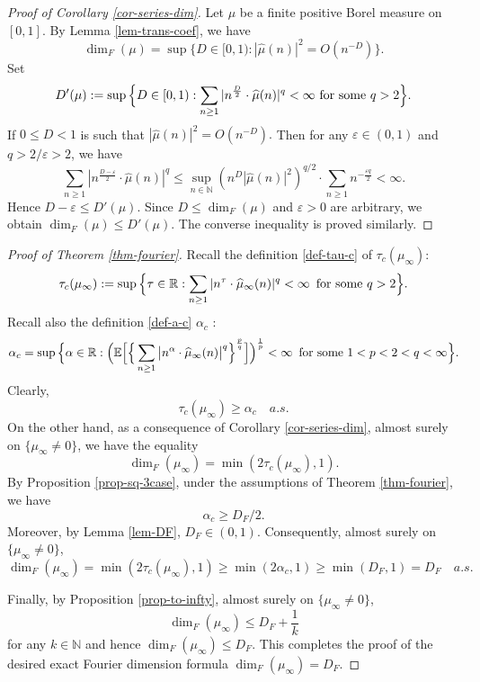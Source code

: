 \documentclass[12pt]{amsart}
\theoremstyle{definition}
\theoremstyle{remark}
\newcommand{\R}{\mathbb{R}}
\newcommand{\N}{\mathbb{N}}
\newcommand{\E}{\mathbb{E}}
\numberwithin{equation}{section}
\begin{document}
\begin{proof}[Proof of Corollary \ref{cor-series-dim}]
Let $\mu$ be a finite positive Borel  measure on $[0,1]$.  By Lemma \ref{lem-trans-coef}, we have 
\[
\dim_F(\mu) =  \sup \{ D \in [0,1):     |\widehat{\mu}(n)|^2  = O(n^{-D})   \}.
\]
Set
 \[
D'(\mu) := \sup \Big\{D \in [0,1):    \text{$  \sum_{n\ge 1 } | n^{\frac{D}{2}}  \cdot \widehat{\mu}(n)|^q <\infty$ for some $q>2$}    \Big\}. 
\]
If $0\le D<1$ is such that  
$
 |\widehat{\mu}(n)|^2  = O(n^{-D}). $ Then for any $\varepsilon\in (0,1)$ and $q>2/\varepsilon>2$, we have  
 \[
  \sum_{n\ge 1 } | n^{\frac{D-\varepsilon}{2}}  \cdot \widehat{\mu}(n)|^q    \le \sup_{n\in \N} (n^D |\widehat{\mu}(n)|^2)^{q/2}    \cdot \sum_{n\ge 1} n^{- \frac{\varepsilon q}{2}}<\infty. 
   \]
Hence  $D-\varepsilon\le D'(\mu)$. Since $D\le \dim_F(\mu)$ and $\varepsilon>0$ are arbitrary, we obtain $\dim_F(\mu)\le D'(\mu)$.  The converse inequality is proved similarly. 
\end{proof}





\begin{proof}[Proof of Theorem \ref{thm-fourier}]
Recall the definition \eqref{def-tau-c} of $\tau_c(\mu_\infty)$:
\[
\tau_c(\mu_\infty): =  \sup \Big\{\tau \in \R: \sum_{n\ge 1} | n^{\tau}  \cdot \widehat{\mu}_\infty(n)|^q<\infty \text{\, for some $q>2$} \Big\}. 
\]
Recall also the definition   \eqref{def-a-c}  $\alpha_c$ :
\[
\alpha_c =  \sup \Big\{\alpha \in \R:    \Big(\E\Big[  \Big\{ \sum_{n \ge 1}    \big| n^{\alpha} \cdot \widehat{\mu}_\infty(n)\big|^q  \Big\}^{\frac{p}{q}}\Big] \Big)^{\frac{1}{p}}  <\infty \text{\, for some $1<p<2<q<\infty$} \Big\}.
\]
Clearly, 
\[
\tau_c(\mu_\infty) \ge \alpha_c \quad a.s. 
\]
On the other hand, as a consequence of Corollary \ref{cor-series-dim},   almost surely on $\{\mu_\infty \ne 0\}$, we have  the equality 
\[
\dim_F(\mu_\infty) = \min( 2 \tau_c(\mu_\infty), 1).
\]
By Proposition \ref{prop-sq-3case}, under the assumptions of Theorem \ref{thm-fourier}, we have 
\[
\alpha_c\ge D_F/2. 
\]
Moreover, by Lemma \ref{lem-DF}, $D_F\in (0,1)$. Consequently,  almost surely on $\{\mu_\infty \ne 0\}$,
\[
\dim_F(\mu_\infty)   = \min(2 \tau_c(\mu_\infty), 1)  \ge    \min(2 \alpha_c, 1) \ge \min( D_F, 1) = D_F \quad a.s. 
\]


Finally, by Proposition \ref{prop-to-infty},  almost surely on $\{\mu_\infty \ne 0\}$, 
\[
\dim_F(\mu_\infty) \le D_F + \frac{1}{k}
\]
 for any $k\in \N$ and hence  
$
\dim_F(\mu_\infty) \le D_F. 
$
This completes the proof of the desired exact Fourier dimension formula $\dim_F(\mu_\infty) = D_F$. 
\end{proof}
\end{document}
